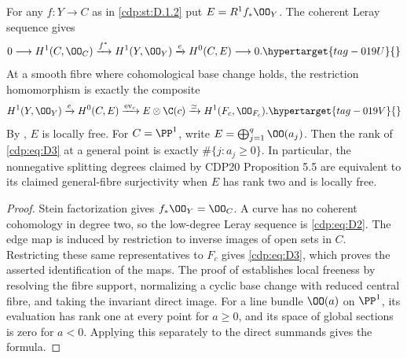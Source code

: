 \begin{proposition}\hypertarget{tag-01G2}{}\label{cdp:st:D.1.4}

For any $f:Y\to C$ as in \ref{cdp:st:D.1.2} put $E=R^1f_*\OO_Y$.
The coherent Leray sequence gives
\begin{equation}
0\longrightarrow H^1(C,\OO_C)\xrightarrow{f^*}H^1(Y,\OO_Y)
\xrightarrow{e}H^0(C,E)\longrightarrow0.               \hypertarget{tag-019U}{}\label{cdp:eq:D2}
\end{equation}
At a smooth fibre where cohomological base change holds, the
restriction homomorphism is exactly the composite
\begin{equation}
H^1(Y,\OO_Y)\xrightarrow{e}H^0(C,E)
\xrightarrow{\operatorname{ev}_c}E\otimes\C(c)
\xrightarrow{\simeq}H^1(F_c,\OO_{F_c}).               \hypertarget{tag-019V}{}\label{cdp:eq:D3}
\end{equation}
By \cite[Theorem~2.2, pp.~4--5]{Viaclovsky2026Combs}, $E$ is locally free. For $C=\PP^1$, write
$E=\bigoplus_{j=1}^q\OO(a_j)$.
Then the rank of \eqref{cdp:eq:D3} at a general point is exactly
$\#\{j:a_j\geq0\}$. In particular, the nonnegative splitting
degrees claimed by CDP20 Proposition 5.5 are equivalent to its
claimed general-fibre surjectivity when $E$ has rank two and is
locally free.
\end{proposition}


\begin{proof}
Stein factorization gives $f_*\OO_Y=\OO_C$. A curve has no coherent
cohomology in degree two, so the low-degree Leray sequence is \eqref{cdp:eq:D2}.
The edge map is induced by restriction to inverse images of open
sets in $C$. Restricting these same representatives to $F_c$ gives
\eqref{cdp:eq:D3}, which proves the asserted identification of the maps.
The proof of \cite[Theorem~2.2, pp.~4--5]{Viaclovsky2026Combs} establishes local freeness by resolving the fibre support,
normalizing a cyclic base change with reduced central fibre, and
taking the invariant direct image. For a line bundle
$\OO(a)$ on $\PP^1$, its evaluation has rank one at every point
for $a\geq0$, and its space of global sections is zero for $a<0$.
Applying this separately to the direct summands gives the formula.

\end{proof}